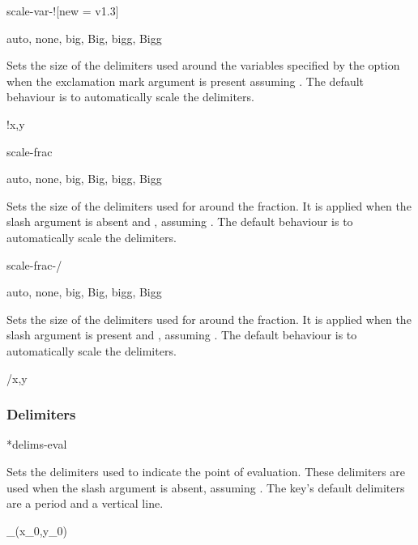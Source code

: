 \begin{option}{scale-var-!}[new = v1.3]
	\begin{values}[default = auto]
		auto, none, big, Big, bigg, Bigg
	\end{values}
	Sets the size of the delimiters used around the variables specified by the  option when the exclamation mark argument is present assuming . The default behaviour is to automatically scale the delimiters.
	\begin{example}
		!{x,y}
	\end{example}
\end{option}

\begin{option}{scale-frac}
	\begin{values}[default = auto]
		auto, none, big, Big, bigg, Bigg
	\end{values}
	Sets the size of the delimiters used for around the fraction. It is applied when the slash argument is absent and , assuming . The default behaviour is to automatically scale the delimiters.
	\begin{example}
		\pdv[scale-frac=bigg, frac]{f}{x,y}
	\end{example}
\end{option}

\begin{option}{scale-frac-/}
	\begin{values}[default = auto]
		auto, none, big, Big, bigg, Bigg
	\end{values}
	Sets the size of the delimiters used for around the fraction. It is applied when the slash argument is present and , assuming . The default behaviour is to automatically scale the delimiters.
	\begin{example}
		/{x,y}
	\end{example}
\end{option}

\subsubsection*{Delimiters}

\begin{option}*{delims-eval}
	\begin{values}[default = .~\cs{rvert}]
		\meta{right delimiter}
	\end{values}
	Sets the delimiters used to indicate the point of evaluation. These delimiters are used when the slash argument is absent, assuming . The key's default delimiters are a period and a vertical line.
	\begin{example}
		_{(x_0,y_0)}
	\end{example}
\end{option}

